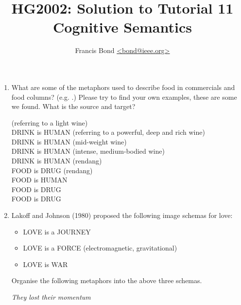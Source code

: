 \documentclass[a4paper]{article}
\title{HG2002: Solution to Tutorial 11\\  Cognitive Semantics}
\author{Francis Bond \url{<bond@ieee.org>}}
\date{}%
\begin{document}
\maketitle



\begin{enumerate}
\item What are some of the metaphors used to describe food in
  commercials and food columns?  (e.g. .)  Please try to find your own examples, these
  are some we found.  What is the source and target?
  
\begin{exe}
  \ex {} (referring to a light wine)
  \\ DRINK is HUMAN
  \ex {} (referring to a
  powerful, deep and rich wine)
  \\ DRINK is HUMAN
  \ex {}
  (mid-weight wine)
  \\ DRINK is HUMAN
  \ex {} (intense, medium-bodied wine)
  \\ DRINK is HUMAN
  \ex {} (rendang)
  \\ FOOD is DRUG
  \ex {} (rendang)
   \\ FOOD is HUMAN
  \ex {}
  \\ FOOD is DRUG
  \ex {}
  \\ FOOD is DRUG
\end{exe}
\item Lakoff and Johnson (1980) proposed the following image schemas for love:
  \begin{itemize}
  \item LOVE is a JOURNEY
  \item LOVE is a FORCE (electromagnetic, gravitational)
  \item LOVE is WAR
  \end{itemize}
Organise the following metaphors into the above three schemas.
\begin{exe}
  \ex \textit{They lost their momentum}

\end{exe}
\end{enumerate}
\end{document}
